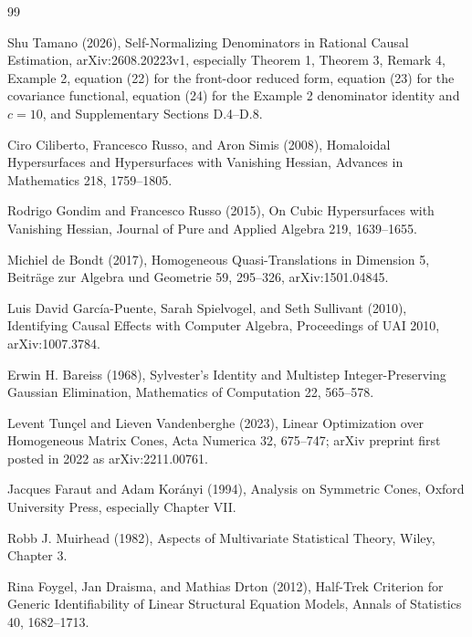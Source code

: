 \documentclass{article}
\begin{document}
\begin{thebibliography}{99}

   Shu Tamano (2026), Self-Normalizing Denominators in Rational Causal Estimation, arXiv:2608.20223v1, especially Theorem 1, Theorem 3, Remark 4, Example 2, equation (22) for the front-door reduced form, equation (23) for the covariance functional, equation (24) for the Example 2 denominator identity and \(c=10\), and Supplementary Sections D.4--D.8.

   Ciro Ciliberto, Francesco Russo, and Aron Simis (2008), Homaloidal Hypersurfaces and Hypersurfaces with Vanishing Hessian, Advances in Mathematics 218, 1759--1805.

   Rodrigo Gondim and Francesco Russo (2015), On Cubic Hypersurfaces with Vanishing Hessian, Journal of Pure and Applied Algebra 219, 1639--1655.

   Michiel de Bondt (2017), Homogeneous Quasi-Translations in Dimension 5, Beiträge zur Algebra und Geometrie 59, 295--326, arXiv:1501.04845.

   Luis David García-Puente, Sarah Spielvogel, and Seth Sullivant (2010), Identifying Causal Effects with Computer Algebra, Proceedings of UAI 2010, arXiv:1007.3784.

   Erwin H. Bareiss (1968), Sylvester's Identity and Multistep Integer-Preserving Gaussian Elimination, Mathematics of Computation 22, 565--578.

   Levent Tunçel and Lieven Vandenberghe (2023), Linear Optimization over Homogeneous Matrix Cones, Acta Numerica 32, 675--747; arXiv preprint first posted in 2022 as arXiv:2211.00761.

   Jacques Faraut and Adam Korányi (1994), Analysis on Symmetric Cones, Oxford University Press, especially Chapter VII.

   Robb J. Muirhead (1982), Aspects of Multivariate Statistical Theory, Wiley, Chapter 3.

   Rina Foygel, Jan Draisma, and Mathias Drton (2012), Half-Trek Criterion for Generic Identifiability of Linear Structural Equation Models, Annals of Statistics 40, 1682--1713.

\end{thebibliography}
\end{document}
